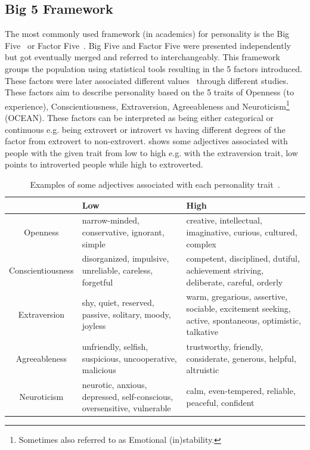 \documentclass[nomenclature, english, biblatex]{kththesis}
\begin{document}
\subsection{Big 5 Framework}
The most commonly used framework (in academics) for personality is the Big Five~\cite{tupes1992recurrent, big5} or Factor Five~\cite{factor5}. Big Five and Factor Five were presented independently but got eventually merged and referred to interchangeably. This framework groups the population using statistical tools resulting in the 5 factors introduced. These factors were later associated different values~\cite{roccas2002big} through different studies. These factors aim to describe personality based on the 5 traits of Openness (to experience), Conscientiousness, Extraversion, Agreeableness and Neuroticism\footnote{Sometimes also referred to as Emotional (in)stability.} (OCEAN). These factors can be interpreted as being either categorical or continuous e.g. being extrovert or introvert vs having different degrees of the factor from extrovert to non-extrovert.  shows some adjectives associated with people with the given trait from low to high e.g. with the extraversion trait, low points to introverted people while high to extroverted.
\begin{table}
    \centering
    \begin{adjustbox}{max width=\textwidth}
    \begin{tabular}{|c|p{}|p{}|}
        \hline
         & Low & High \\
        \hline
        \hline 
        Openness & narrow-minded, conservative, ignorant, simple & creative, intellectual, imaginative, curious, cultured, complex\\
        \hline 
        Conscientiousness & disorganized, impulsive, unreliable, careless, forgetful & competent, disciplined, dutiful, achievement striving, deliberate, careful, orderly\\
        \hline
        Extraversion & shy, quiet, reserved, passive, solitary, moody, joyless & warm, gregarious, assertive, sociable, excitement seeking, active, spontaneous, optimistic, talkative\\
        \hline
        Agreeableness & unfriendly, selfish, suspicious, uncooperative, malicious & trustworthy, friendly, considerate, generous, helpful, altruistic\\
        \hline 
        Neuroticism & neurotic, anxious, depressed, self-conscious, oversensitive, vulnerable & calm, even-tempered, reliable, peaceful, confident\\
        \hline 
    \end{tabular}
    \end{adjustbox}
    \caption{Examples of some adjectives associated with each personality trait~\cite{mairesse2011controlling}.}
    \label{tab:big5}
\end{table}
\end{document}
